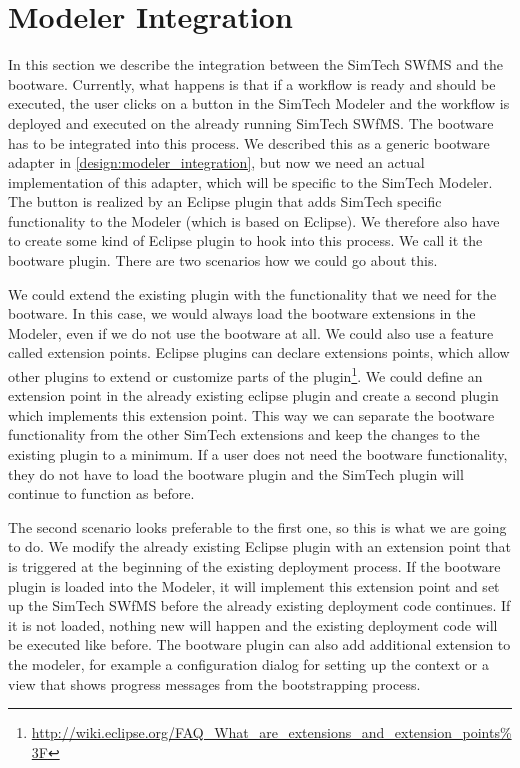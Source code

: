 \section{Modeler Integration}
\label{implementation:modeler_integration}

In this section we describe the integration between the SimTech SWfMS and the bootware.
Currently, what happens is that if a workflow is ready and should be executed, the user clicks on a button in the SimTech Modeler and the workflow is deployed and executed on the already running SimTech SWfMS.
The bootware has to be integrated into this process.
We described this as a generic bootware adapter in \autoref{design:modeler_integration}, but now we need an actual implementation of this adapter, which will be specific to the SimTech Modeler.
The button is realized by an Eclipse plugin that adds SimTech specific functionality to the Modeler (which is based on Eclipse).
We therefore also have to create some kind of Eclipse plugin to hook into this process.
We call it the bootware plugin.
There are two scenarios how we could go about this.

We could extend the existing plugin with the functionality that we need for the bootware.
In this case, we would always load the bootware extensions in the Modeler, even if we do not use the bootware at all.
We could also use a feature called extension points.
Eclipse plugins can declare extensions points, which allow other plugins to extend or customize parts of the plugin\footnote{\url{http://wiki.eclipse.org/FAQ_What_are_extensions_and_extension_points\%3F}}.
We could define an extension point in the already existing eclipse plugin and create a second plugin which implements this extension point.
This way we can separate the bootware functionality from the other SimTech extensions and keep the changes to the existing plugin to a minimum.
If a user does not need the bootware functionality, they do not have to load the bootware plugin and the SimTech plugin will continue to function as before.

The second scenario looks preferable to the first one, so this is what we are going to do.
We modify the already existing Eclipse plugin with an extension point that is triggered at the beginning of the existing deployment process.
If the bootware plugin is loaded into the Modeler, it will implement this extension point and set up the SimTech SWfMS before the already existing deployment code continues.
If it is not loaded, nothing new will happen and the existing deployment code will be executed like before.
The bootware plugin can also add additional extension to the modeler, for example a configuration dialog for setting up the context or a view that shows progress messages from the bootstrapping process.


